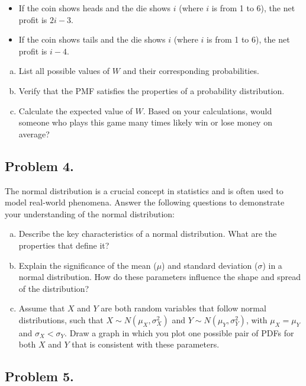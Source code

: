 \documentclass{article}
\begin{document}
\begin{itemize}
\item If the coin shows heads and the die shows \(i\) (where \(i\) is from 1 to 6), the net profit is \(2i - 3\).
\item If the coin shows tails and the die shows \(i\) (where \(i\) is from 1 to 6), the net profit is \(i - 4\).
\end{itemize}

\begin{enumerate}[a)]
\item List all possible values of \(W\) and their corresponding probabilities.
\item Verify that the PMF satisfies the properties of a probability distribution.
\item Calculate the expected value of \(W\). Based on your calculations, would someone who plays this game many times likely win or lose money on average?
\end{enumerate}

\subsection*{Problem 4.}

The normal distribution is a crucial concept in statistics and is often used to model real-world phenomena. Answer the following questions to demonstrate your understanding of the normal distribution:

\begin{enumerate}[a)]
\item Describe the key characteristics of a normal distribution. What are the properties that define it?
\item Explain the significance of the mean (\(\mu\)) and standard deviation (\(\sigma\)) in a normal distribution. How do these parameters influence the shape and spread of the distribution?
\item Assume that \(X\) and \(Y\) are both random variables that follow normal distributions, such that \(X\sim N(\mu_X , \sigma_X^2)\) and \(Y \sim N(\mu_Y , \sigma_Y^2)\), with \(\mu_X=\mu_Y\) and \(\sigma_X < \sigma_Y\). Draw a graph in which you plot one possible pair of PDFs for both \(X\) and \(Y\) that is consistent with these parameters.
\end{enumerate}

\subsection*{Problem 5.}
\end{document}
